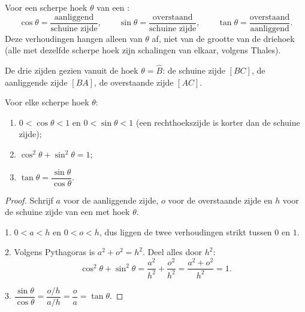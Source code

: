 \begin{definition}\label{def:g9:trig:ratios}
Voor een scherpe hoek $\theta$ van een :
\[
\cos\theta = \frac{\text{aanliggend}}{\text{schuine zijde}},
\qquad
\sin\theta = \frac{\text{overstaand}}{\text{schuine zijde}},
\qquad
\tan\theta = \frac{\text{overstaand}}{\text{aanliggend}} .
\]
Deze verhoudingen hangen alleen van
$\theta$ af, niet van de grootte van de driehoek (alle  met
dezelfde scherpe hoek zijn schalingen van elkaar, volgens Thales).
\end{definition}

\begin{omfigure}

{\small De drie zijden gezien vanuit de hoek $\theta = \widehat B$: de schuine
zijde $[BC]$, de aanliggende zijde $[BA]$, de overstaande zijde $[AC]$.}
\end{omfigure}

\begin{proposition}\label{prop:g9:trig:properties}
Voor elke scherpe hoek $\theta$:
\begin{enumerate}
  \item $0 < \cos\theta < 1$ en $0 < \sin\theta < 1$ (een rechthoekszijde is
        korter dan de schuine zijde);
  \item $\cos^2\theta + \sin^2\theta = 1$;
  \item $\tan\theta = \dfrac{\sin\theta}{\cos\theta}$.
\end{enumerate}
\end{proposition}

\begin{proof}
Schrijf $a$ voor de aanliggende zijde, $o$ voor de overstaande zijde en $h$ voor de
schuine zijde van een  met hoek $\theta$.

1. $0 < a < h$ en $0 < o < h$, dus liggen de twee verhoudingen strikt tussen $0$ en
$1$.

2. Volgens Pythagoras is $a^2 + o^2 = h^2$. Deel alles door $h^2$:
\[
\cos^2\theta + \sin^2\theta
= \frac{a^2}{h^2} + \frac{o^2}{h^2}
= \frac{a^2 + o^2}{h^2} = 1 .
\]

3. $\dfrac{\sin\theta}{\cos\theta} = \dfrac{o/h}{a/h} = \dfrac oa
= \tan\theta$.
\end{proof}

